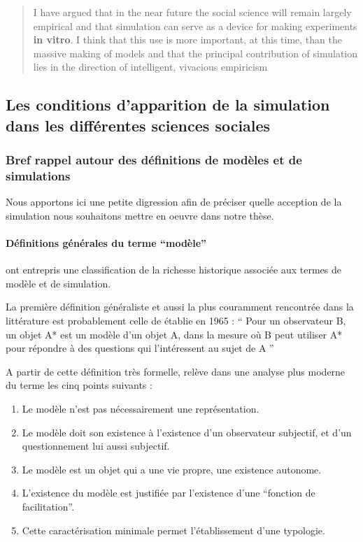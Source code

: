 \foreignblockquote{english}[\cite{Fleisher1965}]{I have argued that in the near future the social science will remain largely empirical and that simulation can serve as a device for making experiments \textbf{in vitro}. I think that this use is more important, at this time, than the massive making of models and that the principal contribution of simulation lies in the direction of intelligent, vivacious empiricism}


\subsection{Les conditions d'apparition de la simulation dans les différentes sciences sociales }
\label{sec:apparition_simu_science_sociales}

\subsubsection{Bref rappel autour des définitions de modèles et de simulations}
\label{ssec:rapell_termes_generiques}

Nous apportons ici une petite digression afin de préciser quelle acception de la simulation nous souhaitons mettre en oeuvre dans notre thèse.

\paragraph{Définitions générales du terme \enquote{modèle}}

\textcite{Varenne2013} ont entrepris une classification de la richesse historique associée aux termes de modèle et de simulation.

La première définition généraliste et aussi la plus couramment rencontrée dans la littérature est probablement celle de \textcite{Minsky1965} établie en 1965 : \enquote{ Pour un observateur B, un objet A* est un modèle d’un objet A, dans la mesure où B peut utiliser A* pour répondre à des questions qui l’intéressent au sujet de A } \autocites{Varenne2008}[15]{Varenne2013b}

A partir de cette définition très formelle, \textcite{Varenne2008} relève dans une analyse plus moderne du terme les cinq points suivants : 
\begin{enumerate}
  \item Le modèle n'est pas nécessairement une représentation.
  \item Le modèle doit son existence à l'existence d'un observateur subjectif, et d'un questionnement lui aussi subjectif.
  \item Le modèle est un objet qui a une vie propre, une existence autonome.
  \item L'existence du modèle est justifiée par l'existence d'une \enquote{fonction de facilitation}.
  \item Cette caractérisation minimale permet l'établissement d'une typologie.
\end{enumerate}

